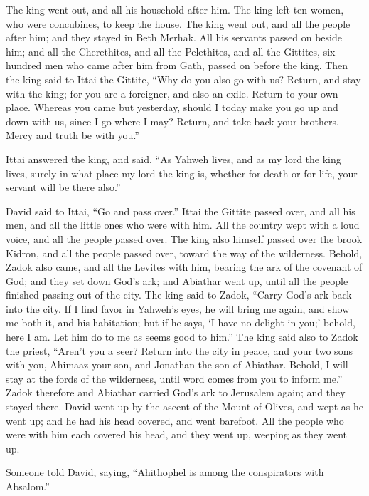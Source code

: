 {\par }{\PP {}The king went out, and all his household after him. The king left ten women, who were concubines, to keep the house.
The king went out, and all the people after him; and they stayed in Beth Merhak.
All his servants passed on beside him; and all the Cherethites, and all the Pelethites, and all the Gittites, six hundred men who came after him from Gath, passed on before the king.
Then the king said to Ittai the Gittite, “Why do you also go with us? Return, and stay with the king; for you are a foreigner, and also an exile. Return to your own place.
Whereas you came but yesterday, should I today make you go up and down with us, since I go where I may? Return, and take back your brothers. Mercy and truth be with you.”
\par }{\PP {}Ittai answered the king, and said, “As Yahweh lives, and as my lord the king lives, surely in what place my lord the king is, whether for death or for life, your servant will be there also.”
\par }{\PP {}David said to Ittai, “Go and pass over.” Ittai the Gittite passed over, and all his men, and all the little ones who were with him.
All the country wept with a loud voice, and all the people passed over. The king also himself passed over the brook Kidron, and all the people passed over, toward the way of the wilderness.
Behold, Zadok also came, and all the Levites with him, bearing the ark of the covenant of God; and they set down God’s ark; and Abiathar went up, until all the people finished passing out of the city.
The king said to Zadok, “Carry God’s ark back into the city. If I find favor in Yahweh’s eyes, he will bring me again, and show me both it, and his habitation;
but if he says, ‘I have no delight in you;’ behold, here I am. Let him do to me as seems good to him.”
The king said also to Zadok the priest, “Aren’t you a seer? Return into the city in peace, and your two sons with you, Ahimaaz your son, and Jonathan the son of Abiathar.
Behold, I will stay at the fords of the wilderness, until word comes from you to inform me.”
Zadok therefore and Abiathar carried God’s ark to Jerusalem again; and they stayed there.
David went up by the ascent of the Mount of Olives, and wept as he went up; and he had his head covered, and went barefoot. All the people who were with him each covered his head, and they went up, weeping as they went up.
\par }{\PP {}Someone told David, saying, “Ahithophel is among the conspirators with Absalom.”
}
